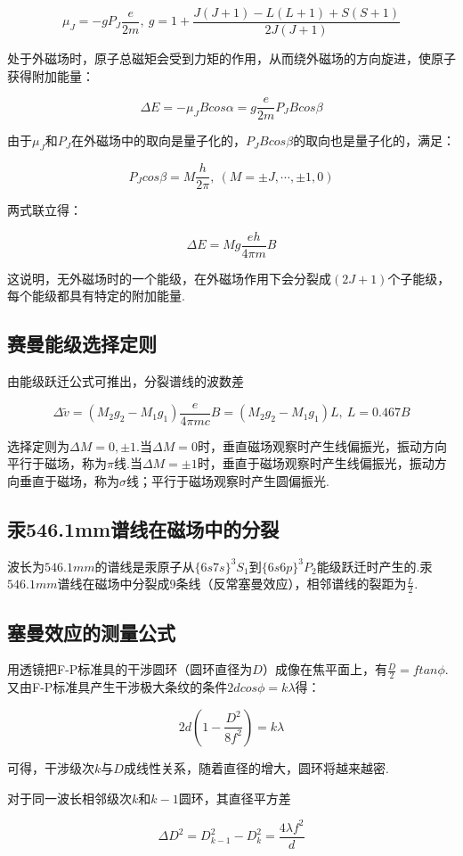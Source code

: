 \documentclass{thureport}
\begin{document}
$$\mu_J=-gP_J\frac{e}{2m},\ g=1+\frac{J(J+1)-L(L+1)+S(S+1)}{2J(J+1)}$$

处于外磁场时，原子总磁矩会受到力矩的作用，从而绕外磁场的方向旋进，使原子获得附加能量：

$$\Delta E=-\mu_JBcos\alpha=g\frac{e}{2m}P_JBcos\beta$$

由于$\mu_J$和$P_J$在外磁场中的取向是量子化的，$P_JBcos\beta$的取向也是量子化的，满足：

$$P_Jcos\beta=M\frac{h}{2\pi},\ (M=\pm J,\cdots,\pm1,0)$$

两式联立得：

$$\Delta E=Mg\frac{eh}{4\pi m}B$$

这说明，无外磁场时的一个能级，在外磁场作用下会分裂成$(2J+1)$个子能级，每个能级都具有特定的附加能量.

\subsection{赛曼能级选择定则}
由能级跃迁公式可推出，分裂谱线的波数差

$$\Delta \tilde{v}=(M_2g_2-M_1g_1)\frac{e}{4\pi mc}B=(M_2g_2-M_1g_1)L,\ L=0.467B$$

选择定则为$\Delta M=0,\pm1$.当$\Delta M=0$时，垂直磁场观察时产生线偏振光，振动方向平行于磁场，称为$\pi$线.当$\Delta M=\pm1$时，垂直于磁场观察时产生线偏振光，振动方向垂直于磁场，称为$\sigma$线；平行于磁场观察时产生圆偏振光.


\subsection{汞546.1mm谱线在磁场中的分裂}
波长为$546.1mm$的谱线是汞原子从$\{6s7s\}^3S_1$到$\{6s6p\}^3P_2$能级跃迁时产生的.汞$546.1mm$谱线在磁场中分裂成9条线（反常塞曼效应），相邻谱线的裂距为$\frac{L}{2}$.

\subsection{塞曼效应的测量公式}
用透镜把F-P标准具的干涉圆环（圆环直径为$D$）成像在焦平面上，有$\frac{D}{2}=ftan\phi$.又由F-P标准具产生干涉极大条纹的条件$2dcos\phi=k\lambda$得：

$$2d(1-\frac{D^2}{8f^2})=k\lambda$$

可得，干涉级次$k$与$D$成线性关系，随着直径的增大，圆环将越来越密.

对于同一波长相邻级次$k$和$k-1$圆环，其直径平方差

$$\Delta D^2=D_{k-1}^2-D_k^2=\frac{4\lambda f^2}{d}$$
\end{document}
